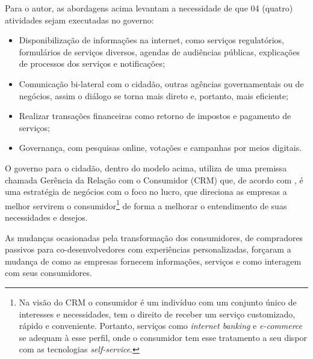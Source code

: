 Para o autor, as abordagens acima levantam a necessidade de que 04 (quatro) atividades sejam executadas no governo: 
\begin{itemize}
	\item Disponibilização de informações na internet, como serviços regulatórios, formulários de serviços diversos, agendas de audiências públicas, explicações de processos dos serviços e notificações;
	\item Comunicação bi-lateral com o cidadão, outras agências governamentais ou de negócios, assim o diálogo se torna mais direto e, portanto, mais eficiente;
	\item Realizar transações financeiras como retorno de impostos e pagamento de serviços;
	\item Governança, com pesquisas online, votações e campanhas por meios digitais.
\end{itemize}

O governo para o cidadão, dentro do modelo acima, utiliza de uma premissa chamada Gerência da Relação com o Consumidor (CRM) que, de acordo com \cite{larsen2005}, é uma estratégia de negócios com o foco no lucro, que direciona as empresas a melhor servirem o consumidor\footnote{Na visão do CRM o consumidor é um indivíduo com um conjunto único de interesses e necessidades, tem o direito de receber um serviço customizado, rápido e conveniente. Portanto, serviços como \textit{internet banking} e \textit{e-commerce} se adequam à esse perfil, onde o consumidor tem esse tratamento a seu dispor com as tecnologias \textit{self-service}.} de forma a melhorar o entendimento de suas necessidades e desejos.

As mudanças ocasionadas pela transformação dos consumidores, de compradores passivos para co-desenvolvedores com experiências personalizadas, forçaram a mudança de como as empresas fornecem informações, serviços e como interagem com seus consumidores. 
